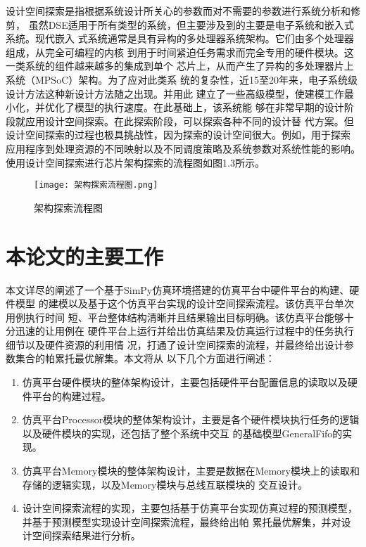 设计空间探索是指根据系统设计所关心的参数而对不需要的参数进行系统分析和修剪\cite{13}，
虽然DSE适用于所有类型的系统，但主要涉及到的主要是电子系统和嵌入式系统。现代嵌入
式系统通常是具有异构的多处理器系统架构。它们由多个处理器组成，从完全可编程的内核
到用于时间紧迫任务需求而完全专用的硬件模块。这一类系统的组件越来越多的集成到单个
芯片上，从而产生了异构的多处理器片上系统（MPSoC）架构\cite{14}。为了应对此类系
统的复杂性，近15至20年来，电子系统级设计方法这种新设计方法随之出现。并用此
建立了一些高级模型，使建模工作最小化，并优化了模型的执行速度。在此基础上，该系统能
够在非常早期的设计阶段就应用设计空间探索。在此探索阶段，可以探索各种不同的设计替
代方案。但设计空间探索的过程也极具挑战性，因为探索的设计空间很大。例如，用于探索
应用程序到处理资源的不同映射\cite{15}以及不同调度策略及系统参数对系统性能的影响。
使用设计空间探索进行芯片架构探索的流程图如图1.3所示。

\begin{figure}
    \centering
    \texttt{[image: 架构探索流程图.png]}
    \caption{架构探索流程图}
    \label{fig:badge}
\end{figure}


\section{本论文的主要工作}
本文详尽的阐述了一个基于SimPy仿真环境搭建的仿真平台中硬件平台的构建、硬件模型
的建模以及基于这个仿真平台实现的设计空间探索流程。该仿真平台单次用例执行时间
短、平台整体结构清晰并且结果输出目标明确。该仿真平台能够十分迅速的让用例在
硬件平台上运行并给出仿真结果及仿真运行过程中的任务执行细节以及硬件资源的利用情
况，打通了设计空间探索的流程，并最终给出设计参数集合的帕累托最优解集。本文将从
以下几个方面进行阐述：

\begin{enumerate}
    \item 仿真平台硬件模块的整体架构设计，主要包括硬件平台配置信息的读取以及硬件平台的构建过程。
    \item 仿真平台Processor模块的整体架构设计，主要是各个硬件模块执行任务的逻辑以及硬件模块的实现，还包括了整个系统中交互
    的基础模型GeneralFifo的实现。
    \item 仿真平台Memory模块的整体架构设计，主要是数据在Memory模块上的读取和存储的逻辑实现，以及Memory模块与总线互联模块的
    交互设计。
    \item 设计空间探索流程的实现，主要包括基于仿真平台实现仿真过程的预测模型，并基于预测模型实现设计空间探索流程，最终给出帕
    累托最优解集，并对设计空间探索结果进行分析。
\end{enumerate}

